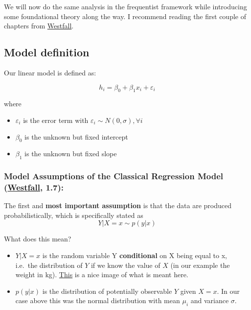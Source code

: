 \documentclass[
]{book}
\providecommand{\tightlist}{%
  \setlength{\itemsep}{0pt}\setlength{\parskip}{0pt}}
\begin{document}
We will now do the same analysis in the frequentist framework while introducing
some foundational theory along the way.
I recommend reading the first couple of chapters from \href{https://www.routledge.com/Understanding-Regression-Analysis-A-Conditional-Distribution-Approach/Westfall-Arias/p/book/9780367493516?srsltid=AfmBOore3O_Ciecl0TTkr9AjPIY1d6OmbQa7o7IAdKpTSkD8s9HkwzD4}{Westfall}.

\subsection{Model definition}\label{model-definition-1}

Our linear model is defined as:

\[ h_i = \beta_0 + \beta_1 x_i + \varepsilon_i \]

where

\begin{itemize}
\tightlist
\item
  \(\varepsilon_i\) is the error term with \(\varepsilon_i \sim N(0, \sigma), \forall i\)
\item
  \(\beta_0\) is the unknown but fixed intercept
\item
  \(\beta_1\) is the unknown but fixed slope
\end{itemize}

\subsubsection{\texorpdfstring{Model Assumptions of the Classical Regression Model (\href{https://www.routledge.com/Understanding-Regression-Analysis-A-Conditional-Distribution-Approach/Westfall-Arias/p/book/9780367493516?srsltid=AfmBOore3O_Ciecl0TTkr9AjPIY1d6OmbQa7o7IAdKpTSkD8s9HkwzD4}{Westfall}, 1.7):}{Model Assumptions of the Classical Regression Model (Westfall, 1.7):}}\label{model-assumptions-of-the-classical-regression-model-westfall-1.7}

The first and \textbf{most important assumption} is that the data are produced\\
probabilistically, which is specifically stated as
\[ Y|X = x \sim p(y|x)\]

What does this mean?

\begin{itemize}
\tightlist
\item
  \(Y|X = x\) is the random variable Y \textbf{conditional} on X being equal to x, i.e.~the
  distribution of \(Y\) if we know the value of \(X\) (in our example the weight in kg).
  \href{https://blogs.sas.com/content/iml/files/2015/09/GLM_normal_identity.png}{This} is a nice image of what is meant here.
\item
  \(p(y|x)\) is the distribution of potentially observable \(Y\) given \(X = x\).
  In our case above this was the normal distribution with mean \(\mu_i\) and variance \(\sigma\).
\end{itemize}
\end{document}
